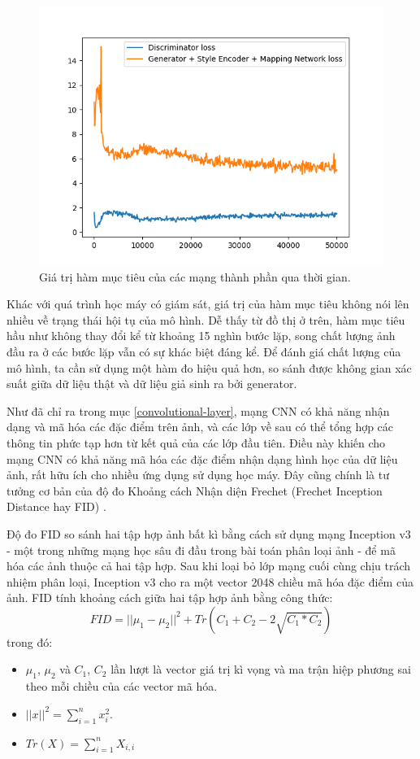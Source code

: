 \documentclass[12pt]{extreport}
\begin{document}
\begin{figure}[H]
    \centering
    \includegraphics[width=\linewidth]{figure40.png}
    \caption{Giá trị hàm mục tiêu của các mạng thành phần qua thời gian.}
\end{figure}

Khác với quá trình học máy có giám sát, giá trị của hàm mục tiêu không nói lên nhiều về trạng thái hội tụ của mô hình. Dễ thấy từ đồ thị ở trên, hàm mục tiêu hầu như không thay đổi kể từ khoảng 15 nghìn bước lặp, song chất lượng ảnh đầu ra ở các bước lặp vẫn có sự khác biệt đáng kể. Để đánh giá chất lượng của mô hình, ta cần sử dụng một hàm đo hiệu quả hơn, so sánh được không gian xác suất giữa dữ liệu thật và dữ liệu giả sinh ra bởi generator.

Như đã chỉ ra trong mục \ref{convolutional-layer}, mạng CNN có khả năng nhận dạng và mã hóa các đặc điểm trên ảnh, và các lớp về sau có thể tổng hợp các thông tin phức tạp hơn từ kết quả của các lớp đầu tiên. Điều này khiến cho mạng CNN có khả năng mã hóa các đặc điểm nhận dạng hình học của dữ liệu ảnh, rất hữu ích cho nhiều ứng dụng sử dụng học máy. Đây cũng chính là tư tưởng cơ bản của độ đo Khoảng cách Nhận diện Frechet (Frechet Inception Distance hay FID) \cite{DBLP:journals/corr/HeuselRUNKH17}.

Độ đo FID so sánh hai tập hợp ảnh bất kì bằng cách sử dụng mạng Inception v3 - một trong những mạng học sâu đi đầu trong bài toán phân loại ảnh - để mã hóa các ảnh thuộc cả hai tập hợp. Sau khi loại bỏ lớp mạng cuối cùng chịu trách nhiệm phân loại, Inception v3 cho ra một vector 2048 chiều mã hóa đặc điểm của ảnh. FID tính khoảng cách giữa hai tập hợp ảnh bằng công thức:
$$ FID = ||\mu_1 - \mu_2||^2 + Tr(C_1 + C_2 - 2\sqrt{C_1 * C_2}) $$
trong đó:
\begin{itemize}
    \item $ \mu_1 $, $ \mu_2 $ và $ C_1 $, $ C_2 $ lần lượt là vector giá trị kì vọng và ma trận hiệp phương sai theo mỗi chiều của các vector mã hóa.
    \item $ ||x||^2 = \sum_{i=1}^{n} x_i^2 $.
    \item $ Tr(X) = \sum_{i=1}^{n} X_{i,i} $
\end{itemize}
\end{document}
